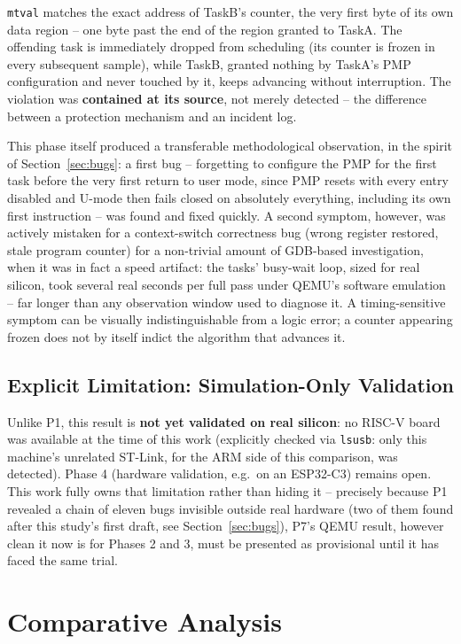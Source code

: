 \documentclass[sigconf,nonacm]{acmart}
\begin{document}
\texttt{mtval} matches the exact address of TaskB's counter, the very first byte of its own data region -- one byte past the end of the region granted to TaskA. The offending task is immediately dropped from scheduling (its counter is frozen in every subsequent sample), while TaskB, granted nothing by TaskA's PMP configuration and never touched by it, keeps advancing without interruption. The violation was \textbf{contained at its source}, not merely detected -- the difference between a protection mechanism and an incident log.

This phase itself produced a transferable methodological observation, in the spirit of Section~\ref{sec:bugs}: a first bug -- forgetting to configure the PMP for the first task before the very first return to user mode, since PMP resets with every entry disabled and U-mode then fails closed on absolutely everything, including its own first instruction -- was found and fixed quickly. A second symptom, however, was actively mistaken for a context-switch correctness bug (wrong register restored, stale program counter) for a non-trivial amount of GDB-based investigation, when it was in fact a speed artifact: the tasks' busy-wait loop, sized for real silicon, took several real seconds per full pass under QEMU's software emulation -- far longer than any observation window used to diagnose it. A timing-sensitive symptom can be visually indistinguishable from a logic error; a counter appearing frozen does not by itself indict the algorithm that advances it.

\subsection{Explicit Limitation: Simulation-Only Validation}

Unlike P1, this result is \textbf{not yet validated on real silicon}: no RISC-V board was available at the time of this work (explicitly checked via \texttt{lsusb}: only this machine's unrelated ST-Link, for the ARM side of this comparison, was detected). Phase 4 (hardware validation, e.g.\ on an ESP32-C3) remains open. This work fully owns that limitation rather than hiding it -- precisely because P1 revealed a chain of eleven bugs invisible outside real hardware (two of them found after this study's first draft, see Section~\ref{sec:bugs}), P7's QEMU result, however clean it now is for Phases 2 and 3, must be presented as provisional until it has faced the same trial.

\section{Comparative Analysis}
\label{sec:comparison}
\end{document}
